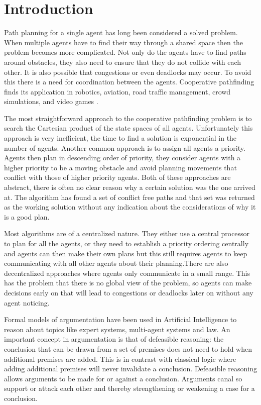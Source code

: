 \section{Introduction}\label{sec:intro}
Path planning for a single agent has long been considered a solved problem.
When multiple agents have to find their way through a shared space then the
problem becomes more complicated. Not only do the agents have to find paths
around obstacles, they also need to ensure that they do not collide with each
other. It is also possible that congestions or even deadlocks may occur. To
avoid this there is a need for coordination between the agents.
Cooperative pathfinding finds its application in robotics, aviation, road
traffic management, crowd simulations, and video games \cite{standley2011}.

The most straightforward approach to the cooperative pathfinding problem is to
search the Cartesian product of the state spaces of all agents. Unfortunately
this approach is very inefficient, the time to find a solution is exponential
in the number of agents. Another common approach is to assign all agents a
priority. Agents then plan in descending order of priority, they consider
agents with a higher priority to be a moving obstacle and avoid planning
movements that conflict with those of higher priority agents. Both of these
approaches are abstract, there is often no clear reason why a certain solution
was the one arrived at. The algorithm has found a set of conflict free paths
and that set was returned as the working solution without any indication about
the considerations of why it is a good plan.

Most algorithms are of a centralized nature. They either use a central
processor to plan for all the agents, or they need to establish a priority
ordering centrally and agents can then make their own plans but this still
requires agents to keep communicating with all other agents about their
planning.There are also decentralized approaches where agents only communicate
in a small range. This has the problem that there is no global view of the
problem, so agents can make decisions early on that will lead to congestions or
deadlocks later on without any agent noticing.

Formal models of argumentation have been used in Artificial Intelligence to
reason about topics like expert systems, multi-agent systems and law. An
important concept in argumentation is that of defeasible reasoning: the
conclusion that can be drawn from a set of premises does not need to hold when
additional premises are added. This is in contrast with classical logic where
adding additional premises will never invalidate a conclusion. Defeasible
reasoning allows arguments to be made for or against a conclusion. Arguments
canal so support or attack each other and thereby strengthening or weakening a
case for a conclusion.

